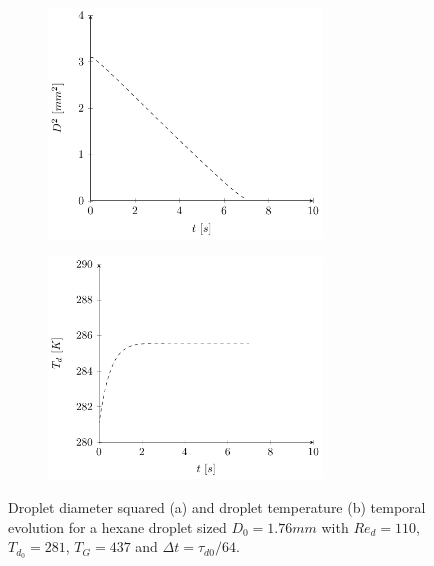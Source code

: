 \documentclass[../Interim_Report_Master]{subfiles}
\begin{document}
\begin{figure}[H]
	\centering
	\begin{subfigure}{\textwidth}
		\centering
		\includegraphics[width=0.8\textwidth]{./Diagrams/Coupled_Heat_Mass_Transfer_Hexane/Coupled_D2_Transfer_Hexane.pdf}
		\caption{}
		\label{coupled_d2_hexane_py}
	\end{subfigure}
\end{figure}
\begin{figure}\ContinuedFloat
	\centering
	\begin{subfigure}{\textwidth}
		\centering
		\includegraphics[width=0.8\textwidth]{./Diagrams/Coupled_Heat_Mass_Transfer_Hexane/Coupled_Heat_Transfer_Hexane.pdf}
		\caption{}
		\label{coupled_heat_hexane_py}
	\end{subfigure}
	\caption{Droplet diameter squared (a) and droplet temperature (b) temporal evolution for a hexane droplet sized $D_0=1.76mm$ with $Re_d=110$, $T_{d_0}=281$, $T_G=437$ and $\Delta t=\tau_{d0}/64$.}
\end{figure}
\end{document}
